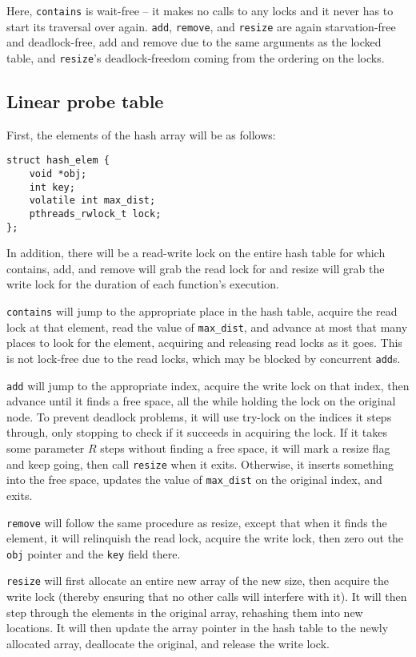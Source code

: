 \documentclass{article}
\begin{document}
Here, \verb|contains| is wait-free -- it makes no calls to any locks and it never has to start its traversal over again. \verb|add|, \verb|remove|, and \verb|resize| are again starvation-free and deadlock-free, add and remove due to the same arguments as the locked table, and \verb|resize|'s deadlock-freedom coming from the ordering on the locks.
\subsection*{Linear probe table}
First, the elements of the hash array will be as follows:
\begin{verbatim}
struct hash_elem {
    void *obj;
    int key;
    volatile int max_dist;
    pthreads_rwlock_t lock;
};
\end{verbatim}
In addition, there will be a read-write lock on the entire hash table for which contains, add, and remove will grab the read lock for and resize will grab the write lock for the duration of each function's execution. 

\verb|contains| will jump to the appropriate place in the hash table, acquire the read lock at that element, read the value of \verb|max_dist|, and advance at most that many places to look for the element, acquiring and releasing read locks as it goes. This is not lock-free due to the read locks, which may be blocked by concurrent \verb|add|s.

\verb|add| will jump to the appropriate index, acquire the write lock on that index, then advance until it finds a free space, all the while holding the lock on the original node. To prevent deadlock problems, it will use try-lock on the indices it steps through, only stopping to check if it succeeds in acquiring the lock. If it takes some parameter $R$ steps without finding a free space, it will mark a resize flag and keep going, then call \verb|resize| when it exits. Otherwise, it inserts something into the free space, updates the value of \verb|max_dist| on the original index, and exits. 

\verb|remove| will follow the same procedure as resize, except that when it finds the element, it will relinquish the read lock, acquire the write lock, then zero out the \verb|obj| pointer and the \verb|key| field there. 

\verb|resize| will first allocate an entire new array of the new size, then acquire the write lock (thereby ensuring that no other calls will interfere with it). It will then step through the elements in the original array, rehashing them into new locations. It will then update the array pointer in the hash table to the newly allocated array, deallocate the original, and release the write lock.
\end{document}
